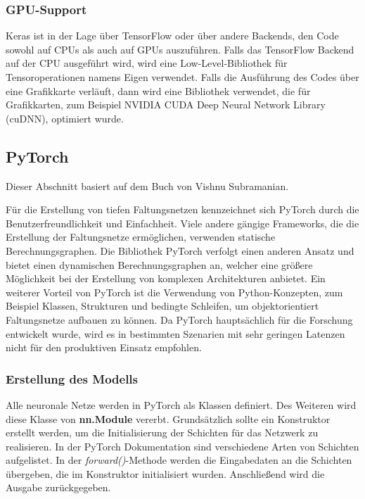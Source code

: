 \subsubsection{GPU-Support}
Keras ist in der Lage über TensorFlow oder über andere Backends, den Code sowohl auf CPUs als auch auf GPUs auszuführen. Falls das TensorFlow Backend auf der CPU ausgeführt wird, wird eine Low-Level-Bibliothek für Tensoroperationen namens Eigen verwendet. Falls die Ausführung des Codes über eine Grafikkarte verläuft, dann wird eine Bibliothek verwendet, die für Grafikkarten, zum Beispiel NVIDIA CUDA Deep Neural Network Library (cuDNN), optimiert wurde\cite{francois}. 

\subsection{PyTorch}
\label{sec:pytorch}
Dieser Abschnitt basiert auf dem Buch von Vishnu Subramanian\cite{Subramanian2018}.
 
Für die Erstellung von tiefen Faltungsnetzen kennzeichnet sich PyTorch durch die Benutzerfreundlichkeit und Einfachheit. Viele andere gängige Frameworks, die die Erstellung der Faltungsnetze ermöglichen, verwenden statische Berechnungsgraphen. Die Bibliothek PyTorch verfolgt einen anderen Ansatz und bietet einen dynamischen Berechnungsgraphen an, welcher eine größere Möglichkeit bei der Erstellung von komplexen Architekturen anbietet. Ein weiterer Vorteil von PyTorch ist die Verwendung von Python-Konzepten, zum Beispiel Klassen, Strukturen und bedingte Schleifen, um objektorientiert Faltungsnetze aufbauen zu können. Da PyTorch hauptsächlich für die Forschung entwickelt wurde, wird es in bestimmten Szenarien mit sehr geringen Latenzen nicht für den produktiven Einsatz empfohlen.

\subsubsection{Erstellung des Modells}

Alle neuronale Netze werden in PyTorch als Klassen definiert. Des Weiteren wird diese Klasse von \textbf{nn.Module} vererbt. Grundsätzlich sollte ein Konstruktor erstellt werden, um die Initialisierung der Schichten für das Netzwerk zu realisieren. In der PyTorch Dokumentation sind verschiedene Arten von Schichten aufgelistet\cite{pytorch_doc}. In der \textit{forward()}-Methode werden die Eingabedaten an die Schichten übergeben, die im Konstruktor initialisiert wurden. Anschließend wird die Ausgabe zurückgegeben.

